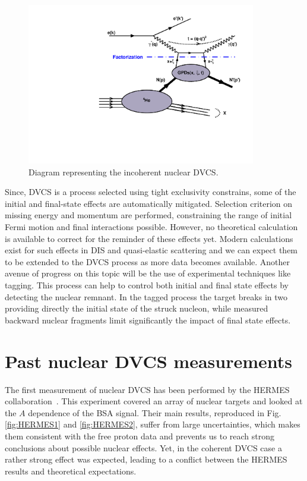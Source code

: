\documentclass{article}
\begin{document}
\begin{figure}[tbp!]
\center
\includegraphics[width=10cm]{fig3/handbag_incoherent.pdf}
\caption{Diagram representing the incoherent nuclear DVCS.}
\label{fig:InCohDiag}
\end{figure}

Since, DVCS is a 
process selected using tight exclusivity constrains, some of the initial and final-state effects are
automatically mitigated. Selection criterion on missing energy and momentum are performed,
constraining the range of initial Fermi motion and final interactions possible. However, no theoretical
calculation is available to correct for the reminder of these effects yet. Modern calculations exist 
for such effects in DIS \cite{Cosyn:2017ekf} and quasi-elastic scattering \cite{Ethier:2014bua}
and we can expect them to be extended to the DVCS 
process as more data becomes available. Another avenue of progress
on this topic will be the use of experimental techniques like tagging. This process
can help to control both initial and final state effects by detecting the nuclear remnant.
In the tagged process the target breaks in two providing directly the initial state
of the struck nucleon, while measured backward nuclear fragments limit significantly the
impact of final state effects.

\section{Past nuclear DVCS measurements}

The first measurement of nuclear DVCS has been performed by the HERMES 
collaboration~\cite{Airapetian:2009cga}. This experiment covered an array of 
nuclear targets and looked at the $A$ dependence of the
BSA signal. Their main results, reproduced in Fig. \ref{fig:HERMES1} and \ref{fig:HERMES2}, suffer
from large uncertainties, which makes them consistent with the free proton data and prevents us to
reach strong conclusions about possible nuclear effects. Yet, in the coherent DVCS case a rather
strong effect was expected, leading to a conflict between the HERMES results and theoretical
expectations. 
\end{document}

